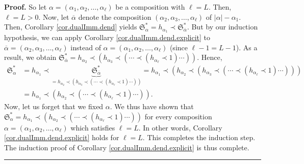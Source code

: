 \documentclass
[numbers=enddot,12pt,final,onecolumn,notitlepage,abstracton]{scrartcl}%
\theoremstyle{definition}
\newenvironment{proof}[1][Proof]{\noindent\textbf{#1.} }{\ \rule{0.5em}{0.5em}}
\newenvironment{verlong}{}{}
\begin{document}
\begin{verlong}
\begin{proof}
So let $\alpha=\left(  \alpha_{1},\alpha_{2},\ldots,\alpha_{\ell}\right)  $ be
a composition with $\ell=L$. Then, $\ell=L>0$. Now, let $\overline{\alpha}$
denote the composition $\left(  \alpha_{2},\alpha_{3},\ldots,\alpha_{\ell
}\right)  $ of $\left\vert \alpha\right\vert -\alpha_{1}$. Then, Corollary
\ref{cor.dualImm.dend} yields $\mathfrak{S}_{\alpha}^{\ast}=h_{\alpha_{1}%
}\left.  \prec\right.  \mathfrak{S}_{\overline{\alpha}}^{\ast}$. But by our
induction hypothesis, we can apply Corollary \ref{cor.dualImm.dend.explicit}
to $\overline{\alpha}=\left(  \alpha_{2},\alpha_{3},\ldots,\alpha_{\ell
}\right)  $ instead of $\alpha=\left(  \alpha_{1},\alpha_{2},\ldots
,\alpha_{\ell}\right)  $ (since $\ell-1=L-1$). As a result, we obtain
$\mathfrak{S}_{\overline{\alpha}}^{\ast}=h_{\alpha_{2}}\left.  \prec\right.
\left(  h_{\alpha_{3}}\left.  \prec\right.  \left(  \cdots\left.
\prec\right.  \left(  h_{\alpha_{\ell}}\left.  \prec\right.  1\right)
\cdots\right)  \right)  $. Hence,%
\begin{align*}
\mathfrak{S}_{\alpha}^{\ast}  &  =h_{\alpha_{1}}\left.  \prec\right.
\underbrace{\mathfrak{S}_{\overline{\alpha}}^{\ast}}_{=h_{\alpha_{2}}\left.
\prec\right.  \left(  h_{\alpha_{3}}\left.  \prec\right.  \left(
\cdots\left.  \prec\right.  \left(  h_{\alpha_{\ell}}\left.  \prec\right.
1\right)  \cdots\right)  \right)  }=h_{\alpha_{1}}\left.  \prec\right.
\left(  h_{\alpha_{2}}\left.  \prec\right.  \left(  h_{\alpha_{3}}\left.
\prec\right.  \left(  \cdots\left.  \prec\right.  \left(  h_{\alpha_{\ell}%
}\left.  \prec\right.  1\right)  \cdots\right)  \right)  \right) \\
&  =h_{\alpha_{1}}\left.  \prec\right.  \left(  h_{\alpha_{2}}\left.
\prec\right.  \left(  \cdots\left.  \prec\right.  \left(  h_{\alpha_{\ell}%
}\left.  \prec\right.  1\right)  \cdots\right)  \right)  .
\end{align*}
Now, let us forget that we fixed $\alpha$. We thus have shown that
\newline$\mathfrak{S}_{\alpha}^{\ast}=h_{\alpha_{1}}\left.  \prec\right.
\left(  h_{\alpha_{2}}\left.  \prec\right.  \left(  \cdots\left.
\prec\right.  \left(  h_{\alpha_{\ell}}\left.  \prec\right.  1\right)
\cdots\right)  \right)  $ for every composition $\alpha=\left(  \alpha
_{1},\alpha_{2},\ldots,\alpha_{\ell}\right)  $ which satisfies $\ell=L$. In
other words, Corollary \ref{cor.dualImm.dend.explicit} holds for $\ell=L$.
This completes the induction step. The induction proof of Corollary
\ref{cor.dualImm.dend.explicit} is thus complete.
\end{proof}
\end{verlong}
\end{document}
